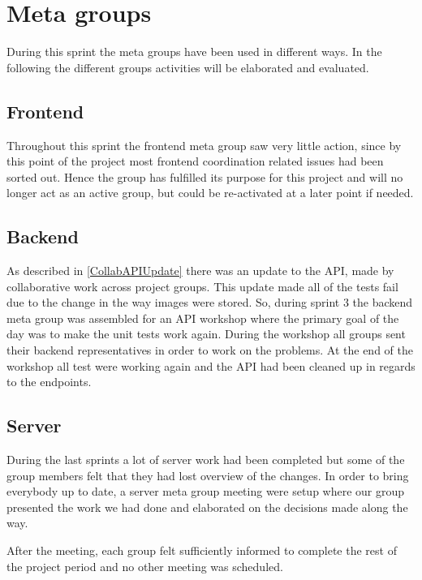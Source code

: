 \section{Meta groups}
During this sprint the meta groups have been used in different ways.
In the following the different groups activities will be elaborated and evaluated.

\subsection{Frontend}
Throughout this sprint the frontend meta group saw very little action, since by this point of the project most frontend coordination related issues had been sorted out.
Hence the group has fulfilled its purpose for this project and will no longer act as an active group, but could be re-activated at a later point if needed.

\subsection{Backend}
As described in \autoref{CollabAPIUpdate} there was an update to the API, made by collaborative work across project groups.
This update made all of the tests fail due to the change in the way images were stored.
So, during sprint 3 the backend meta group was assembled for an API workshop where the primary goal of the day was to make the unit tests work again.
During the workshop all groups sent their backend representatives in order to work on the problems.
At the end of the workshop all test were working again and the API had been cleaned up in regards to the endpoints.

\subsection{Server}
During the last sprints a lot of server work had been completed but some of the group members felt that they had lost overview of the changes.
In order to bring everybody up to date, a server meta group meeting were setup where our group presented the work we had done and elaborated on the decisions made along the way.

After the meeting, each group felt sufficiently informed to complete the rest of the project period and no other meeting was scheduled.

